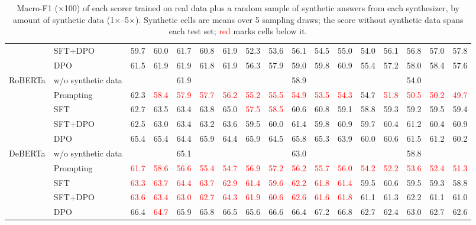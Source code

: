 \begin{table}[t]
\begin{tabular}{llccccccccccccccc}
 & SFT+DPO & 59.7 & 60.0 & 61.7 & 60.8 & 61.9 & 52.3 & 53.6 & 56.1 & 54.5 & 55.0 & 54.0 & 56.1 & 56.8 & 57.0 & 57.8 \\
 & DPO & 61.5 & 61.9 & 61.9 & 61.8 & 61.9 & 56.3 & 57.9 & 59.0 & 59.8 & 60.9 & 55.4 & 57.2 & 58.0 & 58.4 & 57.6 \\
\midrule
\multirow{5}{*}{RoBERTa} & w/o synthetic data & \multicolumn{5}{c}{61.9} & \multicolumn{5}{c}{58.9} & \multicolumn{5}{c}{54.0} \\
 & Prompting & 62.3 & \textcolor{red}{58.4} & \textcolor{red}{57.9} & \textcolor{red}{57.7} & \textcolor{red}{56.2} & \textcolor{red}{55.2} & \textcolor{red}{55.5} & \textcolor{red}{54.9} & \textcolor{red}{53.5} & \textcolor{red}{54.3} & 54.7 & \textcolor{red}{51.8} & \textcolor{red}{50.5} & \textcolor{red}{50.2} & \textcolor{red}{49.7} \\
 & SFT & 62.7 & 63.5 & 63.4 & 63.8 & 65.0 & \textcolor{red}{57.5} & \textcolor{red}{58.5} & 60.6 & 60.8 & 59.1 & 58.8 & 59.3 & 59.2 & 59.5 & 59.4 \\
 & SFT+DPO & 62.5 & 63.0 & 63.4 & 63.2 & 63.6 & 59.5 & 60.0 & 61.4 & 59.8 & 60.9 & 59.7 & 60.4 & 61.2 & 60.4 & 60.9 \\
 & DPO & 65.4 & 65.4 & 64.4 & 65.9 & 64.4 & 65.9 & 64.5 & 65.8 & 65.3 & 63.9 & 60.0 & 60.6 & 61.5 & 61.2 & 60.2 \\
\midrule
\multirow{5}{*}{DeBERTa} & w/o synthetic data & \multicolumn{5}{c}{65.1} & \multicolumn{5}{c}{63.0} & \multicolumn{5}{c}{58.8} \\
 & Prompting & \textcolor{red}{61.7} & \textcolor{red}{58.6} & \textcolor{red}{56.6} & \textcolor{red}{55.4} & \textcolor{red}{54.7} & \textcolor{red}{56.9} & \textcolor{red}{57.2} & \textcolor{red}{56.2} & \textcolor{red}{55.7} & \textcolor{red}{56.0} & \textcolor{red}{54.2} & \textcolor{red}{52.2} & \textcolor{red}{53.6} & \textcolor{red}{52.4} & \textcolor{red}{51.3} \\
 & SFT & \textcolor{red}{63.3} & \textcolor{red}{63.7} & \textcolor{red}{64.4} & \textcolor{red}{63.7} & \textcolor{red}{62.9} & \textcolor{red}{61.4} & \textcolor{red}{59.6} & \textcolor{red}{62.2} & \textcolor{red}{61.8} & \textcolor{red}{61.4} & 59.5 & 60.6 & 59.5 & 59.3 & 58.8 \\
 & SFT+DPO & \textcolor{red}{63.6} & \textcolor{red}{63.4} & \textcolor{red}{63.0} & \textcolor{red}{62.7} & \textcolor{red}{64.3} & \textcolor{red}{61.9} & \textcolor{red}{60.6} & \textcolor{red}{62.6} & \textcolor{red}{61.6} & \textcolor{red}{61.8} & 61.1 & 61.3 & 62.2 & 61.1 & 61.0 \\
 & DPO & 66.4 & \textcolor{red}{64.7} & 65.9 & 65.8 & 66.5 & 65.6 & 66.6 & 66.4 & 67.2 & 66.8 & 62.7 & 62.4 & 63.0 & 62.7 & 62.6 \\
\bottomrule
\end{tabular}
\caption{Macro-F1 ($\times$100) of each scorer trained on real data plus a random sample of synthetic answers from each synthesizer, by amount of synthetic data (1$\times$--5$\times$). Synthetic cells are means over 5 sampling draws; the score without synthetic data spans each test set; \textcolor{red}{red} marks cells below it.}
\label{tab:appendix-random-amount}
\end{table}

